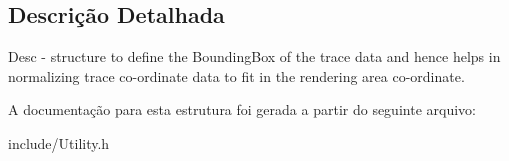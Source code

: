 \subsection{Descrição Detalhada}
Desc -\/ structure to define the BoundingBox of the trace data and hence helps in normalizing trace co-\/ordinate data to fit in the rendering area co-\/ordinate. 

A documentação para esta estrutura foi gerada a partir do seguinte arquivo:\begin{DoxyCompactItemize}
\item 
include/Utility.h\end{DoxyCompactItemize}
